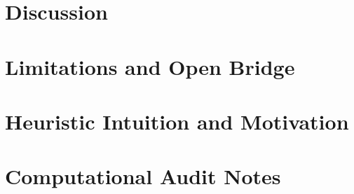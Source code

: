 \documentclass[11pt]{article}
\theoremstyle{plain}
\theoremstyle{definition}
\begin{document}
\section{Discussion}


\section{Limitations and Open Bridge}


\clearpage
\appendix
\section{Heuristic Intuition and Motivation}


\section{Computational Audit Notes}


\clearpage
\printbibliography[heading=bibintoc,title={References}]
\end{document}
